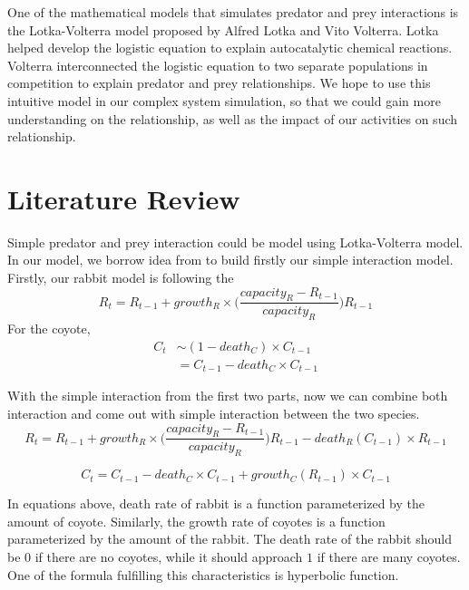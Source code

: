 \documentclass{article}
\begin{document}
\begin{normalsize}
		One of the mathematical models that simulates predator and prey interactions is the Lotka-Volterra model proposed by Alfred Lotka and Vito Volterra. Lotka helped develop the logistic equation to explain autocatalytic chemical reactions. Volterra interconnected the logistic equation to two separate populations in competition to explain predator and prey relationships. We hope to use this intuitive model in our complex system simulation,  so that we could gain more understanding on the relationship, as well as the impact of our activities on such relationship.
		
		\section{Literature Review}
		Simple predator and prey interaction could be model using Lotka-Volterra model. In our model, we borrow idea from \cite{Sayama2013} to build firstly our simple interaction model. Firstly, our rabbit model is following the  
		\begin{equation}
		R_t = R_{t-1} + growth_{R} \times \big( \frac{capacity_{R} - R_{t-1}}{capacity_{R}} \big) R_{t-1}
		\end{equation}
		For the coyote,
		\begin{equation}
		\begin{aligned}
		C_t  & \sim (1 - death_{C}) \times C_{t-1} \\
		&= C_{t-1} - death_{C} \times C_{t-1}
		\end{aligned}
		\end{equation}
		
		With the simple interaction from the first two parts, now we can combine both interaction and come out with simple interaction between the two species.
		\begin{equation}
		R_t = R_{t-1} + growth_{R} \times \big( \frac{capacity_{R} - R_{t-1}}{capacity_{R}} \big) R_{t-1} - death_{R}(C_{t-1})\times R_{t-1}
		\end{equation}
		
		\begin{equation}
		C_t = C_{t-1} - death_{C} \times C_{t-1} + growth_{C}(R_{t-1}) \times C_{t-1}
		\end{equation}
		
		In equations above, death rate of rabbit is a function parameterized by the amount of coyote. Similarly, the growth rate of coyotes is a function parameterized by the amount of the rabbit. The death rate of the rabbit should be $0$ if there are no coyotes, while it should approach $1$ if there are many coyotes. One of the formula fulfilling this characteristics is hyperbolic function.
	

\end{normalsize}
\end{document}
